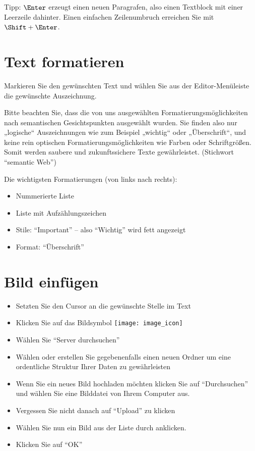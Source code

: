 \documentclass[article, a4paper, oneside, 11pt]{memoir}
\begin{document}
Tipp: $\Enter$ erzeugt einen neuen Paragrafen, also einen Textblock mit einer Leerzeile dahinter. Einen einfachen Zeilenumbruch erreichen Sie mit $\Shift + \Enter$.

\section{Text formatieren}

Markieren Sie den gewünschten Text und wählen Sie aus der Editor-Menüleiste die gewünschte Auszeichnung.

Bitte beachten Sie, dass die von uns ausgewählten
Formatierungsmöglichkeiten nach semantischen Gesichtspunkten ausgewählt
wurden. Sie finden also nur „logische“ Auszeichnungen wie zum Beispiel
„wichtig“ oder „Überschrift“, und keine rein optischen
Formatierungsmöglichkeiten wie Farben oder Schriftgrößen. Somit werden
saubere und zukunftssichere Texte gewährleistet. (Stichwort "`semantic
Web"')

Die wichtigsten Formatierungen (von links nach rechts):

\begin{itemize}
\item Nummerierte Liste
\item Liste mit Aufzählungszeichen
\item Stile: "`Important"' -- also "`Wichtig"' wird fett angezeigt
\item Format: "`Überschrift"'
\end{itemize}


\section{Bild einfügen}

\begin{itemize}
\item Setzten Sie den Cursor an die gewünschte Stelle im Text
\item Klicken Sie auf das Bildsymbol \texttt{[image: image\_icon]}
\item Wählen Sie "`Server durchsuchen"'
\item Wählen oder erstellen Sie gegebenenfalls einen neuen Ordner um eine ordentliche Struktur Ihrer Daten zu gewährleisten
\item Wenn Sie ein neues Bild hochladen möchten klicken Sie auf "`Durchsuchen"' und wählen Sie eine Bilddatei von Ihrem Computer aus.
\item Vergessen Sie nicht danach auf "`Upload"' zu klicken
\item Wählen Sie nun ein Bild aus der Liste durch anklicken.
\item Klicken Sie auf "`OK"'
\end{itemize}
\end{document}
